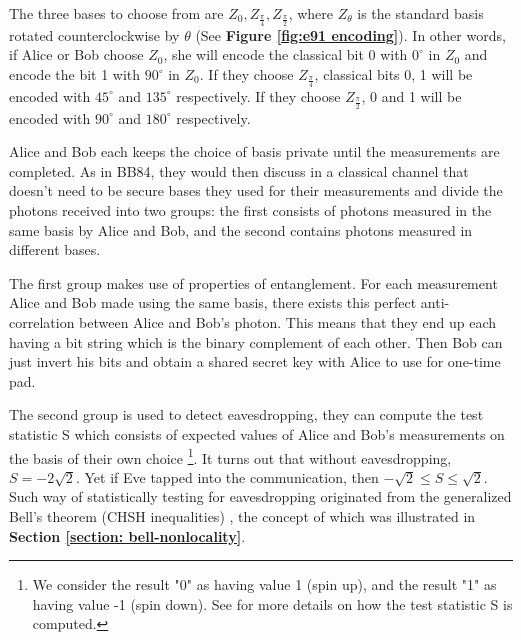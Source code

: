 The three bases to choose from are $Z_0, Z_{\frac{\pi}{4}}, Z_{\frac{\pi}{2}}$, where $Z_\theta$ is the standard basis rotated counterclockwise by $\theta$ (See \textbf{Figure \ref{fig:e91 encoding}}). In other words, if Alice or Bob choose $Z_0$, she will encode the classical bit 0 with  $0^\circ$ in $Z_0$ and encode the bit 1 with $90^\circ$ in $Z_0$. If they choose $Z_{\frac{\pi}{4}}$, classical bits 0, 1 will be encoded with $45^\circ$ and $135^\circ$ respectively. If they choose $Z_{\frac{\pi}{2}}$, 0 and 1 will be encoded with $90^\circ$ and $180^\circ$ respectively.

Alice and Bob each keeps the choice of basis private until the measurements are completed. As in BB84, they would then discuss in a classical channel that doesn't need to be secure bases they used for their measurements and divide the photons received into two groups: the first consists of photons measured in the same basis by Alice and Bob, and the second contains photons measured in different bases. 

The first group makes use of properties of entanglement. For each measurement Alice and Bob made using the same basis, there exists this perfect anti-correlation between Alice and Bob's photon. This means that they end up each having a bit string which is the binary complement of each other. Then Bob can just invert his bits and obtain a shared secret key with Alice to use for one-time pad. 

The second group is used to detect eavesdropping, they can compute the test statistic S which consists of expected values of Alice and Bob's measurements on the basis of their own choice \footnote{We consider the result "0" as having value 1 (spin up), and the result "1" as having value -1 (spin down). See \cite{Ekert1991} for more details on how the test statistic S is computed.}. It turns out that without eavesdropping, $S=-2\sqrt{2}$. Yet if Eve tapped into the communication, then $-\sqrt{2} \le S \le \sqrt{2}$. Such way of statistically testing for eavesdropping originated from the generalized Bell's theorem (CHSH inequalities) \cite{bell1964}, the concept of which was illustrated in \textbf{Section \ref{section: bell-nonlocality}}.


